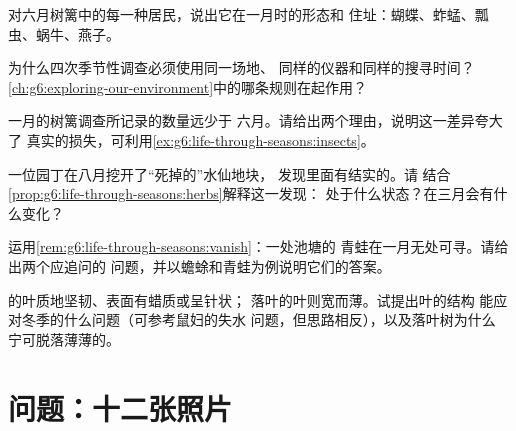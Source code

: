 \begin{exercise}[$\star\star$]\label{exo:g6:life-through-seasons:7}
对六月树篱中的每一种居民，说出它在一月时的形态和
住址：蝴蝶、蚱蜢、瓢虫、蜗牛、燕子。
\end{exercise}

\begin{exercise}[$\star\star$]\label{exo:g6:life-through-seasons:8}
为什么四次季节性调查必须使用同一场地、
同样的仪器和同样的搜寻时间？
\cref{ch:g6:exploring-our-environment}中的哪条规则在起作用？
\end{exercise}

\begin{exercise}[$\star\star$]\label{exo:g6:life-through-seasons:9}
一月的树篱调查所记录的数量远少于
六月。请给出两个理由，说明这一差异夸大了
真实的损失，可利用\cref{ex:g6:life-through-seasons:insects}。
\end{exercise}

\begin{exercise}[$\star\star$]\label{exo:g6:life-through-seasons:10}
一位园丁在八月挖开了“死掉的”水仙地块，
发现里面有结实的。请
结合\cref{prop:g6:life-through-seasons:herbs}解释这一发现：
处于什么状态？在三月会有什么变化？
\end{exercise}

\begin{exercise}[$\star\star$]\label{exo:g6:life-through-seasons:11}
运用\cref{rem:g6:life-through-seasons:vanish}：一处池塘的
青蛙在一月无处可寻。请给出两个应追问的
问题，并以蟾蜍和青蛙为例说明它们的答案。
\end{exercise}

\begin{exercise}[$\star\star\star$]\label{exo:g6:life-through-seasons:12}
的叶质地坚韧、表面有蜡质或呈针状；
落叶的叶则宽而薄。试提出叶的结构
能应对冬季的什么问题（可参考鼠妇的失水
问题，但思路相反），以及落叶树为什么
宁可脱落薄薄的。
\end{exercise}

\section{问题：十二张照片}

